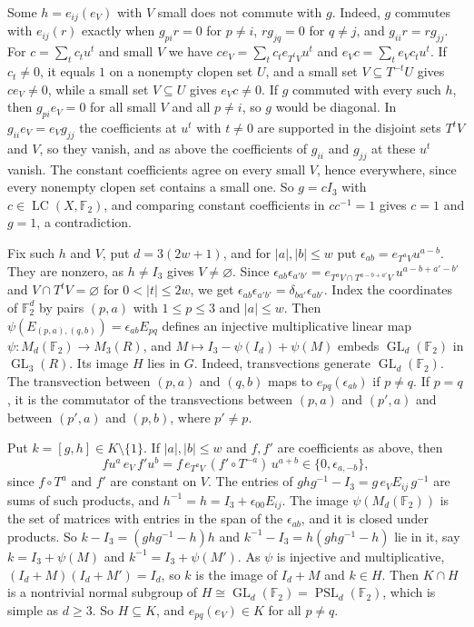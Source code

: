 \documentclass[11pt]{amsart}
\newcommand{\F}{\mathbb F}
\newcommand{\LC}{\operatorname{LC}}
\newcommand{\GL}{\operatorname{GL}}
\newcommand{\PSL}{\operatorname{PSL}}
\begin{document}
Some $h=e_{ij}(e_V)$ with $V$ small does not commute with $g$.
Indeed, $g$ commutes with $e_{ij}(r)$ exactly when $g_{pi}r=0$ for
$p\ne i$, $rg_{jq}=0$ for $q\ne j$, and $g_{ii}r=rg_{jj}$. For
$c=\sum_tc_tu^t$ and small $V$ we have $ce_V=\sum_tc_te_{T^tV}u^t$ and
$e_Vc=\sum_te_Vc_tu^t$. If $c_t\ne0$, it equals $1$ on a nonempty clopen
set $U$, and a small set $V\subseteq T^{-t}U$ gives $ce_V\ne0$, while a
small set $V\subseteq U$ gives $e_Vc\ne0$. If $g$ commuted with every
such $h$, then $g_{pi}e_V=0$ for all small $V$ and all $p\ne i$, so $g$
would be diagonal. In $g_{ii}e_V=e_Vg_{jj}$ the coefficients at $u^t$
with $t\ne0$ are supported in the disjoint sets $T^tV$ and $V$, so they
vanish, and as above the coefficients of $g_{ii}$ and $g_{jj}$ at these
$u^t$ vanish. The constant coefficients agree on every small $V$, hence
everywhere, since every nonempty clopen set contains a small one. So
$g=cI_3$ with $c\in\LC(X,\F_2)$, and comparing constant coefficients in
$cc^{-1}=1$ gives $c=1$ and $g=1$, a contradiction.

Fix such $h$ and $V$, put $d=3(2w+1)$, and for $|a|,|b|\le w$ put
$\epsilon_{ab}=e_{T^aV}u^{a-b}$. They are nonzero, as $h\ne I_3$ gives
$V\ne\varnothing$. Since
$\epsilon_{ab}\epsilon_{a'b'}=e_{T^aV\cap T^{a-b+a'}V}\,u^{a-b+a'-b'}$ and
$V\cap T^tV=\varnothing$ for $0<|t|\le2w$, we get
$\epsilon_{ab}\epsilon_{a'b'}=\delta_{ba'}\epsilon_{ab'}$. Index the
coordinates of $\F_2^d$ by pairs $(p,a)$ with $1\le p\le3$ and
$|a|\le w$. Then $\psi(E_{(p,a),(q,b)})=\epsilon_{ab}E_{pq}$ defines an
injective multiplicative linear map $\psi\colon M_d(\F_2)\to M_3(R)$, and
$M\mapsto I_3-\psi(I_d)+\psi(M)$ embeds $\GL_d(\F_2)$ in $\GL_3(R)$. Its
image $H$ lies in $G$. Indeed, transvections generate $\GL_d(\F_2)$. The
transvection between $(p,a)$ and $(q,b)$ maps to $e_{pq}(\epsilon_{ab})$
if $p\ne q$. If $p=q$, it is the commutator of the transvections between
$(p,a)$ and $(p',a)$ and between $(p',a)$ and $(p,b)$, where $p'\ne p$.

Put $k=[g,h]\in K\setminus\{1\}$. If $|a|,|b|\le w$ and $f,f'$ are
coefficients as above, then
\[
  fu^a\,e_V\,f'u^b=f\,e_{T^aV}\,(f'\circ T^{-a})\,u^{a+b}
  \in\{0,\epsilon_{a,-b}\},
\]
since $f\circ T^a$ and $f'$ are constant on $V$. The entries of
$ghg^{-1}-I_3=g\,e_VE_{ij}\,g^{-1}$ are sums of such products, and
$h^{-1}=h=I_3+\epsilon_{00}E_{ij}$. The image $\psi(M_d(\F_2))$ is the set
of matrices with entries in the span of the $\epsilon_{ab}$, and it is
closed under products. So $k-I_3=(ghg^{-1}-h)h$ and
$k^{-1}-I_3=h(ghg^{-1}-h)$ lie in it, say $k=I_3+\psi(M)$ and
$k^{-1}=I_3+\psi(M')$. As $\psi$ is injective and multiplicative,
$(I_d+M)(I_d+M')=I_d$, so $k$ is the image of $I_d+M$ and $k\in H$. Then
$K\cap H$ is a nontrivial normal subgroup of
$H\cong\GL_d(\F_2)=\PSL_d(\F_2)$, which is simple as $d\ge3$. So
$H\subseteq K$, and $e_{pq}(e_V)\in K$ for all $p\ne q$.
\end{document}
